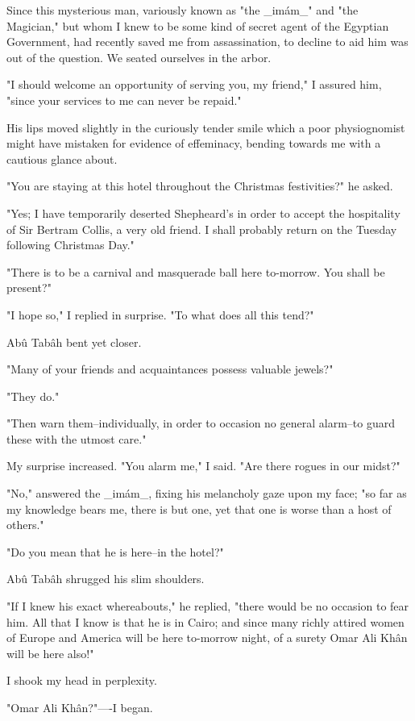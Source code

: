 Since this mysterious man, variously known as "the _imám_" and "the
Magician," but whom I knew to be some kind of secret agent of the
Egyptian Government, had recently saved me from assassination, to
decline to aid him was out of the question. We seated ourselves in the
arbor.

"I should welcome an opportunity of serving you, my friend," I assured
him, "since your services to me can never be repaid."

His lips moved slightly in the curiously tender smile which a poor
physiognomist might have mistaken for evidence of effeminacy, bending
towards me with a cautious glance about.

"You are staying at this hotel throughout the Christmas festivities?"
he asked.

"Yes; I have temporarily deserted Shepheard's in order to accept the
hospitality of Sir Bertram Collis, a very old friend. I shall probably
return on the Tuesday following Christmas Day."

"There is to be a carnival and masquerade ball here to-morrow. You
shall be present?"

"I hope so," I replied in surprise. "To what does all this tend?"

Abû Tabâh bent yet closer.

"Many of your friends and acquaintances possess valuable jewels?"

"They do."

"Then warn them--individually, in order to occasion no general
alarm--to guard these with the utmost care."

My surprise increased. "You alarm me," I said. "Are there rogues in
our midst?"

"No," answered the _imám_, fixing his melancholy gaze upon my face;
"so far as my knowledge bears me, there is but one, yet that one is
worse than a host of others."

"Do you mean that he is here--in the hotel?"

Abû Tabâh shrugged his slim shoulders.

"If I knew his exact whereabouts," he replied, "there would be no
occasion to fear him. All that I know is that he is in Cairo; and
since many richly attired women of Europe and America will be here
to-morrow night, of a surety Omar Ali Khân will be here also!"

I shook my head in perplexity.

"Omar Ali Khân?"----I began.

